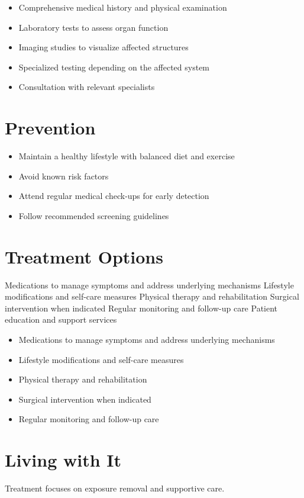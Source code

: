 \begin{itemize}[noitemsep]
  \item Comprehensive medical history and physical examination
  \item Laboratory tests to assess organ function
  \item Imaging studies to visualize affected structures
  \item Specialized testing depending on the affected system
  \item Consultation with relevant specialists
\end{itemize}
\section{Prevention}
\begin{itemize}[noitemsep]
  \item Maintain a healthy lifestyle with balanced diet and exercise
  \item Avoid known risk factors
  \item Attend regular medical check-ups for early detection
  \item Follow recommended screening guidelines
\end{itemize}
\section{Treatment Options}
Medications to manage symptoms and address underlying mechanisms Lifestyle modifications and self-care measures Physical therapy and rehabilitation Surgical intervention when indicated Regular monitoring and follow-up care Patient education and support services

\begin{itemize}[noitemsep]
  \item Medications to manage symptoms and address underlying mechanisms
  \item Lifestyle modifications and self-care measures
  \item Physical therapy and rehabilitation
  \item Surgical intervention when indicated
  \item Regular monitoring and follow-up care
\end{itemize}
\section{Living with It}
Treatment focuses on exposure removal and supportive care.

